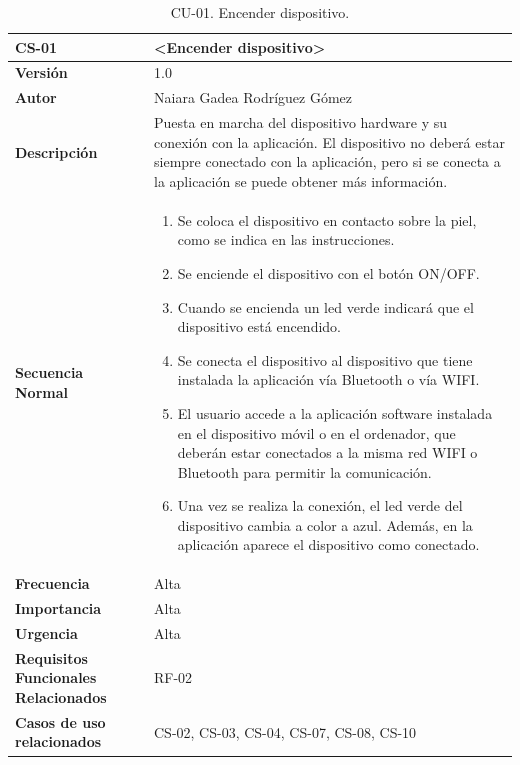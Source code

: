 \begin{table}[h!]
\centering
\begin{tabular}{ |m{3cm}|m{11cm}|  } 
\hline
\cellcolor[HTML]{B9E3F0}\centering\textbf{CS-01} & \cellcolor[HTML]{B9E3F0}\textbf{<Encender dispositivo>}\\

\hline
\cellcolor[HTML]{EFEFEF}\textbf{Versión}             & 1.0  \\
\hline
\cellcolor[HTML]{EFEFEF}\textbf{Autor}                & Naiara Gadea Rodríguez Gómez\\
\hline
\cellcolor[HTML]{EFEFEF}\textbf{Descripción}                & {Puesta en marcha del dispositivo hardware y su conexión con la aplicación. El dispositivo no deberá estar siempre conectado con la aplicación, pero si se conecta a la aplicación se puede obtener más información. }\\
\hline
\cellcolor[HTML]{EFEFEF}\textbf{Secuencia \newline Normal}                &                 
        \begin{enumerate}
			\def\labelenumi{\arabic{enumi}.}
			\tightlist
			\item Se coloca el dispositivo en contacto sobre la piel, como se indica en las instrucciones.
			\item Se enciende el dispositivo con el botón ON/OFF.
                \item Cuando se encienda un led verde indicará que el dispositivo está encendido.  
                \item Se conecta el dispositivo al dispositivo que tiene instalada la aplicación vía Bluetooth o vía WIFI.
                \item El usuario accede a la aplicación software instalada en el dispositivo móvil o en el ordenador, que deberán estar conectados a la misma red WIFI o Bluetooth para permitir la comunicación.  
                \item Una vez se realiza la conexión, el led verde del dispositivo cambia a color a azul. Además, en la aplicación aparece el dispositivo como conectado. 
		\end{enumerate}\\
\hline
\cellcolor[HTML]{EFEFEF}\textbf{Frecuencia}                & Alta\\
\hline
\cellcolor[HTML]{EFEFEF}\textbf{Importancia}                & Alta\\
\hline
\cellcolor[HTML]{EFEFEF}\textbf{Urgencia}                & Alta\\
\hline
\cellcolor[HTML]{EFEFEF}\textbf{Requisitos Funcionales Relacionados}                & {RF-02}\\
\hline
\cellcolor[HTML]{EFEFEF}\textbf{Casos de uso relacionados}                & {CS-02, CS-03, CS-04, CS-07, CS-08, CS-10}\\
\hline
\end{tabular}
\caption{CU-01. Encender dispositivo.}
\end{table}

